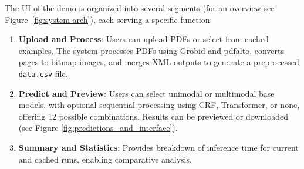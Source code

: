 \documentclass[runningheads]{llncs}
\begin{document}
The UI of the demo is organized into several segments (for an overview see Figure~\ref{fig:system-arch}), each serving a specific function:

\begin{enumerate}
	\item \textbf{Upload and Process}: Users can upload PDFs or select from cached examples. The system processes PDFs using Grobid and pdfalto, converts pages to bitmap images, and merges XML outputs to generate a preprocessed \texttt{data.csv} file.

	\item \textbf{Predict and Preview}: Users can select unimodal or multimodal base models, with optional sequential processing using CRF, Transformer, or none, offering 12 possible combinations. Results can be previewed or downloaded (see Figure \ref{fig:predictions_and_interface}).

	\item \textbf{Summary and Statistics}: Provides breakdown of inference time for current and cached runs, enabling comparative analysis.
\end{enumerate}
\end{document}

